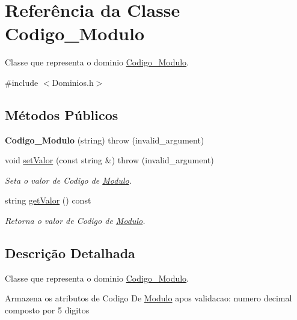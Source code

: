 \hypertarget{class_codigo___modulo}{
\section{\-Referência da \-Classe \-Codigo\-\_\-\-Modulo}
\label{class_codigo___modulo}
}


\-Classe que representa o dominio \hyperlink{class_codigo___modulo}{\-Codigo\-\_\-\-Modulo}.  




{\ttfamily \#include $<$\-Dominios.\-h$>$}

\subsection*{\-Métodos \-Públicos}
\begin{DoxyCompactItemize}
\item 
\hypertarget{class_codigo___modulo_af02fd77a63061429f2951bc78741093e}{
{\bfseries \-Codigo\-\_\-\-Modulo} (string)  throw (invalid\-\_\-argument)}
\label{class_codigo___modulo_af02fd77a63061429f2951bc78741093e}

\item 
void \hyperlink{class_codigo___modulo_a974ed9c3733dcf75c362c53653e407e7}{set\-Valor} (const string \&)  throw (invalid\-\_\-argument)
\begin{DoxyCompactList}\small\item\em \-Seta o valor de \-Codigo de \hyperlink{class_modulo}{\-Modulo}. \end{DoxyCompactList}\item 
string \hyperlink{class_codigo___modulo_a87112e0fb26a7d32fe8cb06cc7d32746}{get\-Valor} () const 
\begin{DoxyCompactList}\small\item\em \-Retorna o valor de \-Codigo de \hyperlink{class_modulo}{\-Modulo}. \end{DoxyCompactList}\end{DoxyCompactItemize}


\subsection{\-Descrição \-Detalhada}
\-Classe que representa o dominio \hyperlink{class_codigo___modulo}{\-Codigo\-\_\-\-Modulo}. 

\-Armazena os atributos de \-Codigo \-De \hyperlink{class_modulo}{\-Modulo} apos validacao\-: numero decimal composto por 5 digitos 


